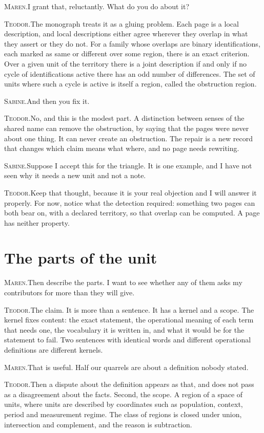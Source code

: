 \documentclass[11pt]{article}
\newcommand{\say}[2]{\par\noindent\textsc{#1.}\enspace #2\par}
\newcommand{\MA}[1]{\say{Maren}{#1}}
\newcommand{\TE}[1]{\say{Teodor}{#1}}
\newcommand{\SA}[1]{\say{Sabine}{#1}}
\begin{document}
\MA{I grant that, reluctantly. What do you do about it?}

\TE{The monograph treats it as a gluing problem. Each page is a local description, and local descriptions either agree wherever they overlap in what they assert or they do not. For a family whose overlaps are binary identifications, each marked as same or different over some region, there is an exact criterion. Over a given unit of the territory there is a joint description if and only if no cycle of identifications active there has an odd number of differences. The set of units where such a cycle is active is itself a region, called the obstruction region.}

\SA{And then you fix it.}

\TE{No, and this is the modest part. A distinction between senses of the shared name can remove the obstruction, by saying that the pages were never about one thing. It can never create an obstruction. The repair is a new record that changes which claim means what where, and no page needs rewriting.}

\SA{Suppose I accept this for the triangle. It is one example, and I have not seen why it needs a new unit and not a note.}

\TE{Keep that thought, because it is your real objection and I will answer it properly. For now, notice what the detection required: something two pages can both bear on, with a declared territory, so that overlap can be computed. A page has neither property.}

\section{The parts of the unit}

\MA{Then describe the parts. I want to see whether any of them asks my contributors for more than they will give.}

\TE{The claim. It is more than a sentence. It has a kernel and a scope. The kernel fixes content: the exact statement, the operational meaning of each term that needs one, the vocabulary it is written in, and what it would be for the statement to fail. Two sentences with identical words and different operational definitions are different kernels.}

\MA{That is useful. Half our quarrels are about a definition nobody stated.}

\TE{Then a dispute about the definition appears as that, and does not pass as a disagreement about the facts. Second, the scope. A region of a space of units, where units are described by coordinates such as population, context, period and measurement regime. The class of regions is closed under union, intersection and complement, and the reason is subtraction.}
\end{document}
